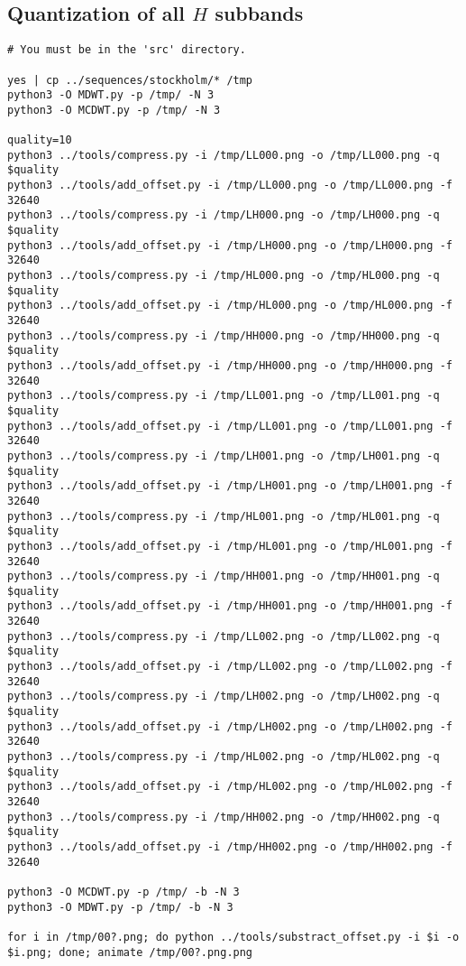 \subsection{Quantization of all $H$ subbands}
\begin{verbatim}
# You must be in the 'src' directory.

yes | cp ../sequences/stockholm/* /tmp
python3 -O MDWT.py -p /tmp/ -N 3
python3 -O MCDWT.py -p /tmp/ -N 3

quality=10
python3 ../tools/compress.py -i /tmp/LL000.png -o /tmp/LL000.png -q $quality
python3 ../tools/add_offset.py -i /tmp/LL000.png -o /tmp/LL000.png -f 32640
python3 ../tools/compress.py -i /tmp/LH000.png -o /tmp/LH000.png -q $quality
python3 ../tools/add_offset.py -i /tmp/LH000.png -o /tmp/LH000.png -f 32640
python3 ../tools/compress.py -i /tmp/HL000.png -o /tmp/HL000.png -q $quality
python3 ../tools/add_offset.py -i /tmp/HL000.png -o /tmp/HL000.png -f 32640
python3 ../tools/compress.py -i /tmp/HH000.png -o /tmp/HH000.png -q $quality
python3 ../tools/add_offset.py -i /tmp/HH000.png -o /tmp/HH000.png -f 32640
python3 ../tools/compress.py -i /tmp/LL001.png -o /tmp/LL001.png -q $quality
python3 ../tools/add_offset.py -i /tmp/LL001.png -o /tmp/LL001.png -f 32640
python3 ../tools/compress.py -i /tmp/LH001.png -o /tmp/LH001.png -q $quality
python3 ../tools/add_offset.py -i /tmp/LH001.png -o /tmp/LH001.png -f 32640
python3 ../tools/compress.py -i /tmp/HL001.png -o /tmp/HL001.png -q $quality
python3 ../tools/add_offset.py -i /tmp/HL001.png -o /tmp/HL001.png -f 32640
python3 ../tools/compress.py -i /tmp/HH001.png -o /tmp/HH001.png -q $quality
python3 ../tools/add_offset.py -i /tmp/HH001.png -o /tmp/HH001.png -f 32640
python3 ../tools/compress.py -i /tmp/LL002.png -o /tmp/LL002.png -q $quality
python3 ../tools/add_offset.py -i /tmp/LL002.png -o /tmp/LL002.png -f 32640
python3 ../tools/compress.py -i /tmp/LH002.png -o /tmp/LH002.png -q $quality
python3 ../tools/add_offset.py -i /tmp/LH002.png -o /tmp/LH002.png -f 32640
python3 ../tools/compress.py -i /tmp/HL002.png -o /tmp/HL002.png -q $quality
python3 ../tools/add_offset.py -i /tmp/HL002.png -o /tmp/HL002.png -f 32640
python3 ../tools/compress.py -i /tmp/HH002.png -o /tmp/HH002.png -q $quality
python3 ../tools/add_offset.py -i /tmp/HH002.png -o /tmp/HH002.png -f 32640

python3 -O MCDWT.py -p /tmp/ -b -N 3
python3 -O MDWT.py -p /tmp/ -b -N 3

for i in /tmp/00?.png; do python ../tools/substract_offset.py -i $i -o $i.png; done; animate /tmp/00?.png.png
\end{verbatim}


